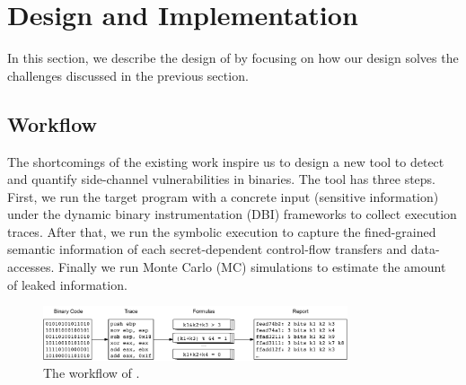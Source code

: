 \section{Design and Implementation}
In this section, we describe the design of \tool{} by focusing on
how our design solves the challenges discussed in the previous
section.

\subsection{Workflow}
The shortcomings of the existing work inspire us to design a new tool to detect
and quantify side-channel vulnerabilities in binaries. The tool has three
steps. First, we run the target program with a concrete input 
(sensitive information) under the dynamic binary instrumentation (DBI) frameworks
to collect execution traces. After that, we run the symbolic execution 
to capture the fined-grained semantic information of each secret-dependent 
control-flow transfers and data-accesses. 
Finally we run Monte Carlo (MC) simulations to estimate the amount of leaked
information. 

\begin{figure}[ht]
    \centering
    \includegraphics[width=0.8\textwidth]{./figures/workflow.pdf}
    \caption{The workflow of \tool{}.}
    \label{fig:Test}
\end{figure}

